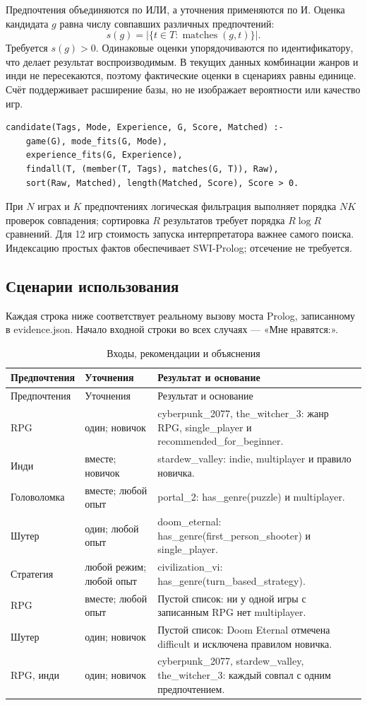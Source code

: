 Предпочтения объединяются по ИЛИ, а уточнения применяются по И.
Оценка кандидата $g$ равна числу совпавших различных предпочтений:
\[
s(g)=\left|\{t\in T:\operatorname{matches}(g,t)\}\right|.
\]
Требуется $s(g)>0$. Одинаковые оценки упорядочиваются по идентификатору,
что делает результат воспроизводимым. В текущих данных комбинации жанров
и инди не пересекаются, поэтому фактические оценки в сценариях равны единице.
Счёт поддерживает расширение базы, но не изображает вероятности или качество игр.

\begin{lstlisting}
candidate(Tags, Mode, Experience, G, Score, Matched) :-
    game(G), mode_fits(G, Mode),
    experience_fits(G, Experience),
    findall(T, (member(T, Tags), matches(G, T)), Raw),
    sort(Raw, Matched), length(Matched, Score), Score > 0.
\end{lstlisting}

При $N$ играх и $K$ предпочтениях логическая фильтрация выполняет порядка $NK$
проверок совпадения; сортировка $R$ результатов требует порядка $R\log R$ сравнений.
Для 12 игр стоимость запуска интерпретатора важнее самого поиска.
Индексацию простых фактов обеспечивает SWI-Prolog; отсечение не требуется.

\subsection{Сценарии использования}
Каждая строка ниже соответствует реальному вызову моста Prolog, записанному
в evidence.json. Начало входной строки во всех случаях --- «Мне нравятся:».

\begin{longtable}{P{3.0cm}P{3.0cm}P{8.0cm}}
\caption{Входы, рекомендации и объяснения}\\\toprule
Предпочтения & Уточнения & Результат и основание\\\midrule\endfirsthead
\toprule Предпочтения & Уточнения & Результат и основание\\\midrule\endhead
RPG & один; новичок & cyberpunk\_2077, the\_witcher\_3: жанр RPG, single\_player и recommended\_for\_beginner.\\
Инди & вместе; новичок & stardew\_valley: indie, multiplayer и правило новичка.\\
Головоломка & вместе; любой опыт & portal\_2: has\_genre(puzzle) и multiplayer.\\
Шутер & один; любой опыт & doom\_eternal: has\_genre(first\_person\_shooter) и single\_player.\\
Стратегия & любой режим; любой опыт & civilization\_vi: has\_genre(turn\_based\_strategy).\\
RPG & вместе; любой опыт & Пустой список: ни у одной игры с записанным RPG нет multiplayer.\\
Шутер & один; новичок & Пустой список: Doom Eternal отмечена difficult и исключена правилом новичка.\\
RPG, инди & один; новичок & cyberpunk\_2077, stardew\_valley, the\_witcher\_3: каждый совпал с одним предпочтением.\\\bottomrule
\end{longtable}

